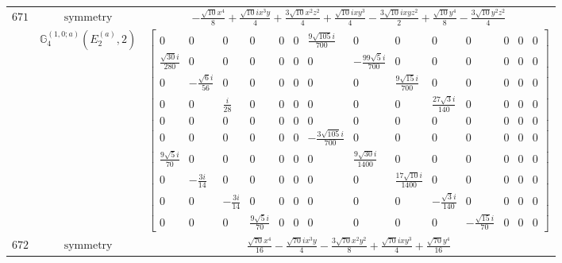 \documentclass[fleqn,8pt,landscape]{jsarticle}
\begin{document}
\begin{longtable}{ccc}
$ 671 $ & $ \text{symmetry} $ & $ - \frac{\sqrt{10} x^{4}}{8} + \frac{\sqrt{10} i x^{3} y}{4} + \frac{3 \sqrt{10} x^{2} z^{2}}{4} + \frac{\sqrt{10} i x y^{3}}{4} - \frac{3 \sqrt{10} i x y z^{2}}{2} + \frac{\sqrt{10} y^{4}}{8} - \frac{3 \sqrt{10} y^{2} z^{2}}{4} $ \\
$  $ & $ \mathbb{G}_{4}^{(1,0;a)}(E_{2}^{(a)},2) $ & $ \begin{bmatrix} 0 & 0 & 0 & 0 & 0 & 0 & \frac{9 \sqrt{105} i}{700} & 0 & 0 & 0 & 0 & 0 & 0 & 0 \\ \frac{\sqrt{30} i}{280} & 0 & 0 & 0 & 0 & 0 & 0 & - \frac{99 \sqrt{5} i}{700} & 0 & 0 & 0 & 0 & 0 & 0 \\ 0 & - \frac{\sqrt{6} i}{56} & 0 & 0 & 0 & 0 & 0 & 0 & \frac{9 \sqrt{15} i}{700} & 0 & 0 & 0 & 0 & 0 \\ 0 & 0 & \frac{i}{28} & 0 & 0 & 0 & 0 & 0 & 0 & \frac{27 \sqrt{3} i}{140} & 0 & 0 & 0 & 0 \\ 0 & 0 & 0 & 0 & 0 & 0 & 0 & 0 & 0 & 0 & 0 & 0 & 0 & 0 \\ 0 & 0 & 0 & 0 & 0 & 0 & - \frac{3 \sqrt{105} i}{700} & 0 & 0 & 0 & 0 & 0 & 0 & 0 \\ \frac{9 \sqrt{5} i}{70} & 0 & 0 & 0 & 0 & 0 & 0 & \frac{9 \sqrt{30} i}{1400} & 0 & 0 & 0 & 0 & 0 & 0 \\ 0 & - \frac{3 i}{14} & 0 & 0 & 0 & 0 & 0 & 0 & \frac{17 \sqrt{10} i}{1400} & 0 & 0 & 0 & 0 & 0 \\ 0 & 0 & - \frac{3 i}{14} & 0 & 0 & 0 & 0 & 0 & 0 & - \frac{\sqrt{3} i}{140} & 0 & 0 & 0 & 0 \\ 0 & 0 & 0 & \frac{9 \sqrt{5} i}{70} & 0 & 0 & 0 & 0 & 0 & 0 & - \frac{\sqrt{15} i}{70} & 0 & 0 & 0 \end{bmatrix} $ \\ \hline
$ 672 $ & $ \text{symmetry} $ & $ \frac{\sqrt{70} x^{4}}{16} - \frac{\sqrt{70} i x^{3} y}{4} - \frac{3 \sqrt{70} x^{2} y^{2}}{8} + \frac{\sqrt{70} i x y^{3}}{4} + \frac{\sqrt{70} y^{4}}{16} $ \\

\end{longtable}
\end{document}
